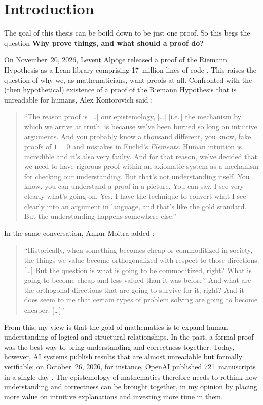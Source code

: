 \section{Introduction}

The goal of this thesis can be boild down to be just one proof. So this begs the question 
\textbf{ Why prove things, and what should a proof do?}


On November~20, 2026, Levent Alpöge released a proof of the Riemann
Hypothesis as a Lean library comprising 17~million lines of code
\cite{alpoege2026}. This raises the question of why we, as
mathematicians, want proofs at all. Confronted with the (then
hypothetical) existence of a proof of the Riemann Hypothesis that is
unreadable for humans, Alex Kontorovich said \cite[8:30\,min ff.]{3b1b2025}:

\begin{quote}
\enquote{The reason proof is [\dots] our epistemology, [\dots] [i.e.\,] the mechanism
by which we arrive at truth, is because we've been burned so long on
intuitive arguments. And you probably know a thousand different, you
know, fake proofs of $1=0$ and mistakes in Euclid's \emph{Elements}.
Human intuition is incredible and it's also very faulty. And for that
reason, we've decided that we need to have rigorous proof within an
axiomatic system as a mechanism for checking our understanding. But
that's not understanding itself. You know, you can understand a proof
in a picture. You can say, I see very clearly what's going on. Yes, I
have the technique to convert what I see clearly into an argument in
language, and that's like the gold standard. But the understanding
happens somewhere else.}
\end{quote}

In the same conversation, Ankur Moitra added \cite[10:59\,min ff.]{3b1b2025}:

\begin{quote}
\enquote{Historically, when something becomes cheap or commoditized in
society, the things we value become orthogonalized with respect to
those directions. [\dots] But the question is what is going to be
commoditized, right? What is going to become cheap and less valued than
it was before? And what are the orthogonal directions that are going to
survive for it, right? And it does seem to me that certain types of
problem solving are going to become cheaper. [\dots]}
\end{quote}

From this, my view is that the goal of mathematics is to expand human
understanding of logical and structural relationships. In the past, a
formal proof was the best way to bring understanding and correctness
together. Today, however, AI systems publish results that are almost
unreadable but formally verifiable; on October~26, 2026, for instance,
OpenAI published 721~manuscripts in a single day \cite{openai2026}.
The epistemology of mathematics therefore needs to rethink how
understanding and correctness can be brought together, in my opinion by
placing more value on intuitive explanations and investing more time
in them.